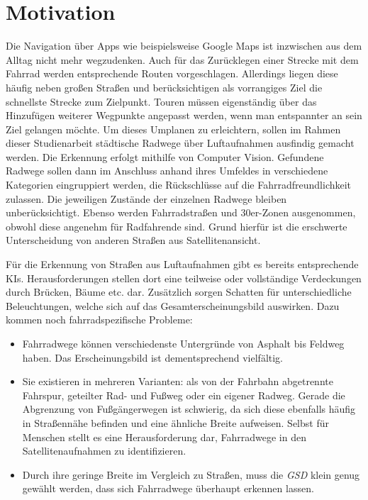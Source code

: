 \chapter{Motivation}

Die Navigation über Apps wie beispielsweise Google Maps ist inzwischen aus dem Alltag nicht mehr wegzudenken.
Auch für das Zurücklegen einer Strecke mit dem Fahrrad werden entsprechende Routen vorgeschlagen.
Allerdings liegen diese häufig neben großen Straßen und berücksichtigen als vorrangiges Ziel die schnellste Strecke zum Zielpunkt.
Touren müssen eigenständig über das Hinzufügen weiterer Wegpunkte angepasst werden, wenn man entspannter an sein Ziel gelangen möchte.
Um dieses Umplanen zu erleichtern, sollen im Rahmen dieser Studienarbeit städtische Radwege über Luftaufnahmen ausfindig gemacht werden.
Die Erkennung erfolgt mithilfe von Computer Vision.
Gefundene Radwege sollen dann im Anschluss anhand ihres Umfeldes in verschiedene Kategorien eingruppiert werden, die Rückschlüsse auf die Fahrradfreundlichkeit zulassen.
Die jeweiligen Zustände der einzelnen Radwege bleiben unberücksichtigt.
Ebenso werden Fahrradstraßen und 30er-Zonen ausgenommen, obwohl diese angenehm für Radfahrende sind.
Grund hierfür ist die erschwerte Unterscheidung von anderen Straßen aus Satellitenansicht.

Für die Erkennung von Straßen aus Luftaufnahmen gibt es bereits entsprechende KIs.
Herausforderungen stellen dort eine teilweise oder vollständige Verdeckungen durch Brücken, Bäume etc. dar.
Zusätzlich sorgen Schatten für unterschiedliche Beleuchtungen, welche sich auf das Gesamterscheinungsbild auswirken.
Dazu kommen noch fahrradspezifische Probleme: 


\begin{itemize}
	\item Fahrradwege können verschiedenste Untergründe von Asphalt bis Feldweg haben.
			Das Erscheinungsbild ist dementsprechend vielfältig.
	\item Sie existieren in mehreren Varianten: als von der Fahrbahn abgetrennte Fahrspur, geteilter Rad- und Fußweg oder ein eigener Radweg.
			Gerade die Abgrenzung von Fußgängerwegen ist schwierig, da sich diese ebenfalls häufig in Straßennähe befinden und eine ähnliche Breite aufweisen.
			Selbst für Menschen stellt es eine Herausforderung dar, Fahrradwege in den Satellitenaufnahmen zu identifizieren.
	\item Durch ihre geringe Breite im Vergleich zu Straßen, muss die \textit{\ac{GSD}} klein genug gewählt werden, dass sich Fahrradwege überhaupt erkennen lassen.
\end{itemize}

